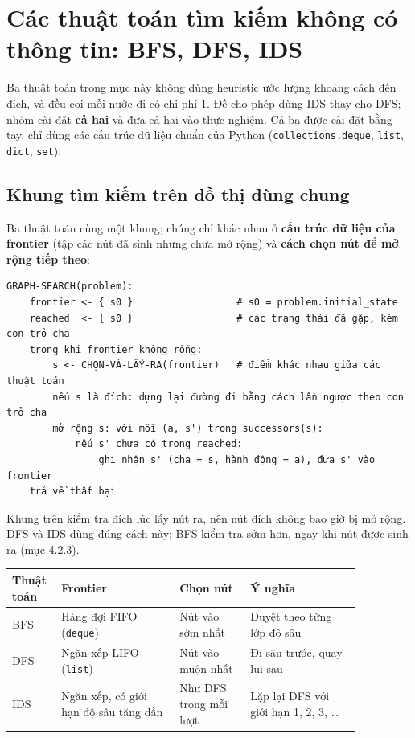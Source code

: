 \section{Các thuật toán tìm kiếm không có thông tin: BFS, DFS, IDS}

Ba thuật toán trong mục này không dùng heuristic ước lượng khoảng cách đến đích, và đều coi mỗi nước đi có chi phí 1. Đề cho phép dùng IDS thay cho DFS; nhóm cài đặt \textbf{cả hai} và đưa cả hai vào thực nghiệm. Cả ba được cài đặt bằng tay, chỉ dùng các cấu trúc dữ liệu chuẩn của Python (\texttt{collections.deque}, \texttt{list}, \texttt{dict}, \texttt{set}).

\subsection{Khung tìm kiếm trên đồ thị dùng chung}

Ba thuật toán cùng một khung; chúng chỉ khác nhau ở \textbf{cấu trúc dữ liệu của frontier} (tập các nút đã sinh nhưng chưa mở rộng) và \textbf{cách chọn nút để mở rộng tiếp theo}:

\begin{Verbatim}[breaklines=true, fontsize=\footnotesize, frame=single]
GRAPH-SEARCH(problem):
    frontier <- { s0 }                  # s0 = problem.initial_state
    reached  <- { s0 }                  # các trạng thái đã gặp, kèm con trỏ cha
    trong khi frontier không rỗng:
        s <- CHỌN-VÀ-LẤY-RA(frontier)   # điểm khác nhau giữa các thuật toán
        nếu s là đích: dựng lại đường đi bằng cách lần ngược theo con trỏ cha
        mở rộng s: với mỗi (a, s') trong successors(s):
            nếu s' chưa có trong reached:
                ghi nhận s' (cha = s, hành động = a), đưa s' vào frontier
    trả về thất bại
\end{Verbatim}

Khung trên kiểm tra đích lúc lấy nút ra, nên nút đích không bao giờ bị mở rộng. DFS và IDS dùng đúng cách này; BFS kiểm tra sớm hơn, ngay khi nút được sinh ra (mục 4.2.3).

{\renewcommand{\arraystretch}{1.25}
\begin{longtable}{|>{\raggedright\arraybackslash}p{0.083\linewidth}|>{\raggedright\arraybackslash}p{0.306\linewidth}|>{\raggedright\arraybackslash}p{0.182\linewidth}|>{\raggedright\arraybackslash}p{0.289\linewidth}|}
\hline
\textbf{Thuật toán} & \textbf{Frontier} & \textbf{Chọn nút} & \textbf{Ý nghĩa} \\ \hline
\endhead
\hline
\endlastfoot
BFS & Hàng đợi FIFO (\texttt{deque}) & Nút vào sớm nhất & Duyệt theo từng lớp độ sâu \\ \hline
DFS & Ngăn xếp LIFO (\texttt{list}) & Nút vào muộn nhất & Đi sâu trước, quay lui sau \\ \hline
IDS & Ngăn xếp, có giới hạn độ sâu tăng dần & Như DFS trong mỗi lượt & Lặp lại DFS với giới hạn 1, 2, 3, … \\
\end{longtable}
}

